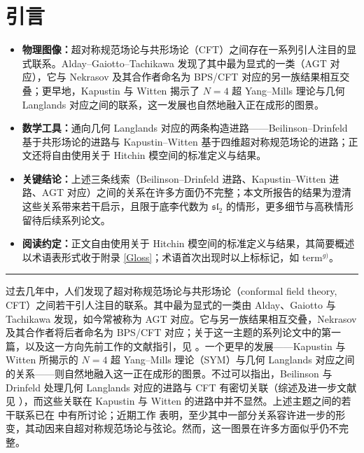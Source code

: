 \section{引言}

\begin{keytakeaways}
\begin{itemize}
  \item \textbf{物理图像：}超对称规范场论与共形场论（CFT）之间存在一系列引人注目的显式联系。Alday--Gaiotto--Tachikawa 发现了其中最为显式的一类（AGT 对应），它与 Nekrasov 及其合作者命名为 BPS/CFT 对应的另一族结果相互交叠；更早地，Kapustin 与 Witten 揭示了 $N=4$ 超 Yang--Mills 理论与几何 Langlands 对应之间的联系，这一发展也自然地融入正在成形的图景。
  \item \textbf{数学工具：}通向几何 Langlands 对应的两条构造进路——Beilinson--Drinfeld 基于共形场论的进路与 Kapustin--Witten 基于四维超对称规范场论的进路；正文还将自由使用关于 Hitchin 模空间的标准定义与结果。
  \item \textbf{关键结论：}上述三条线索（Beilinson--Drinfeld 进路、Kapustin--Witten 进路、AGT 对应）之间的关系在许多方面仍不完整；本文所报告的结果为澄清这些关系带来若干启示，且限于底李代数为 $\mathfrak{sl}_2$ 的情形，更多细节与高秩情形留待后续系列论文。
  \item \textbf{阅读约定：}正文自由使用关于 Hitchin 模空间的标准定义与结果，其简要概述以术语表形式收于附录 \ref{Gloss}；术语首次出现时以上标标记，如 term$^{g)}$。
\end{itemize}
\end{keytakeaways}

\bigskip
\noindent\rule{\textwidth}{0.6pt}
\bigskip

过去几年中，人们发现了超对称规范场论与共形场论（conformal field theory, CFT）之间若干引人注目的联系。其中最为显式的一类由 Alday、Gaiotto 与 Tachikawa 发现\cite{AGT}，如今常被称为 AGT 对应。它与另一族结果相互交叠，Nekrasov 及其合作者将后者命名为 BPS/CFT 对应；关于这一主题的系列论文中的第一篇，以及这一方向先前工作的文献指引，见 \cite{N15}。一个更早的发展——Kapustin 与 Witten 所揭示的 $N=4$ 超 Yang--Mills 理论（SYM）与几何 Langlands 对应之间的关系\cite{KW}——则自然地融入这一正在成形的图景\cite{NW,NRS}。不过可以指出，Beilinson 与 Drinfeld 处理几何 Langlands 对应的进路与 CFT 有密切关联（综述及进一步文献见 \cite{Fr07}），而这些关联在 Kapustin 与 Witten 的进路中并不显然。上述主题之间的若干联系已在 \cite{NW,T10,NRS,GW} 中有所讨论；近期工作 \cite{KP,AFO} 表明，至少其中一部分关系容许进一步的形变，其动因来自超对称规范场论与弦论。然而，这一图景在许多方面似乎仍不完整。

